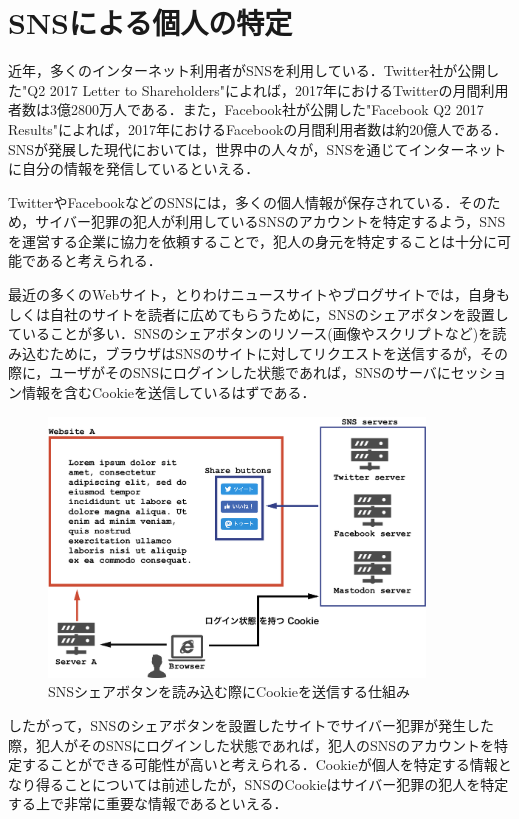 \documentclass[10pt, a4paper]{jreport}
\begin{document}
\section{SNSによる個人の特定}
近年，多くのインターネット利用者がSNSを利用している\cite{many_people_use_sns}．Twitter社が公開した"Q2 2017 Letter to Shareholders"によれば，2017年におけるTwitterの月間利用者数は3億2800万人である\cite{many_people_use_twitter}．また，Facebook社が公開した"Facebook Q2 2017 Results"によれば，2017年におけるFacebookの月間利用者数は約20億人である\cite{many_people_use_facebook}．SNSが発展した現代においては，世界中の人々が，SNSを通じてインターネットに自分の情報を発信しているといえる．

TwitterやFacebookなどのSNSには，多くの個人情報が保存されている．そのため，サイバー犯罪の犯人が利用しているSNSのアカウントを特定するよう，SNSを運営する企業に協力を依頼することで，犯人の身元を特定することは十分に可能であると考えられる．

最近の多くのWebサイト，とりわけニュースサイトやブログサイトでは，自身もしくは自社のサイトを読者に広めてもらうために，SNSのシェアボタンを設置していることが多い．SNSのシェアボタンのリソース(画像やスクリプトなど)を読み込むために，ブラウザはSNSのサイトに対してリクエストを送信するが，その際に，ユーザがそのSNSにログインした状態であれば，SNSのサーバにセッション情報を含むCookieを送信しているはずである．

\begin{figure}[H]
	\begin{center}
		\includegraphics[width=100mm]{figures/proposed_system.pdf}
	\end{center}
	\caption{SNSシェアボタンを読み込む際にCookieを送信する仕組み}
	\label{fig: proposed_system}
\end{figure}

したがって，SNSのシェアボタンを設置したサイトでサイバー犯罪が発生した際，犯人がそのSNSにログインした状態であれば，犯人のSNSのアカウントを特定することができる可能性が高いと考えられる．Cookieが個人を特定する情報となり得ることについては前述したが，SNSのCookieはサイバー犯罪の犯人を特定する上で非常に重要な情報であるといえる．
\end{document}
